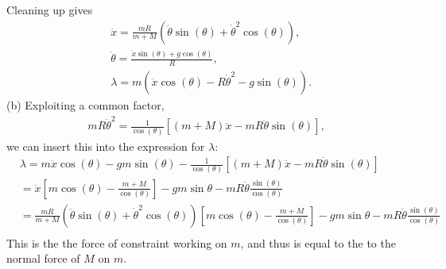 \documentclass{article}
\begin{document}
        Cleaning up gives
        \begin{align*}
            &\ddot x = \frac{mR}{m + M} \left(\ddot \theta \sin(\theta) + \dot \theta^ 2 \cos(\theta)\right),\\
            & \ddot \theta =\frac{\ddot x \sin(\theta) + g \cos(\theta)}{R}, \\
            & \lambda = m\left(\ddot x \cos(\theta)- R \dot \theta^2 - g \sin(\theta)\right).
        \end{align*}
        (b) Exploiting a common factor, 
        \begin{align*}
            m R \dot \theta^2 = \frac{1}{\cos(\theta)}\left[(m + M) \ddot x - m R \ddot \theta \sin(\theta) \right],
        \end{align*}
        we can insert this into the expression for $\lambda$:
        \begin{align*}
            & \lambda = m \ddot x \cos(\theta) - g m \sin(\theta)
            - \frac{1}{\cos(\theta)}\left[(m + M) \ddot x - m R \ddot \theta \sin(\theta) \right] \\
            & = \ddot x \left[ m \cos(\theta) - \frac{m + M}{\cos(\theta)} \right] - g m \sin\theta - m R \ddot \theta \frac{\sin(\theta)}{\cos(\theta)} \\
            & = \frac{mR}{m + M} \left(\ddot \theta \sin(\theta) + \dot \theta^ 2 \cos(\theta)\right)\left[ m \cos(\theta) - \frac{m + M}{\cos(\theta)} \right] - g m \sin\theta - m R \ddot \theta \frac{\sin(\theta)}{\cos(\theta)} \\
        \end{align*}
        This is the the force of constraint working on $m$, and thus is equal to the to the normal force of $M$ on $m$.
\end{document}
